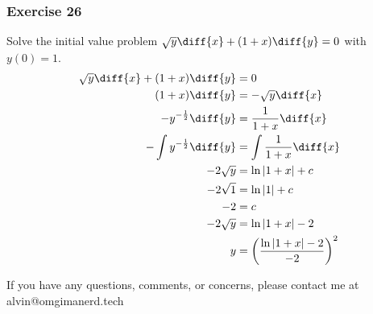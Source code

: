\documentclass{math}
\begin{document}
\subsubsection*{Exercise 26}
Solve the initial value problem \( \sqrt{y}\diff{x}+(1+x)\diff{y} = 0 \) with
\( y(0) = 1 \).
\begin{align*}
  \sqrt{y}\diff{x}+(1+x)\diff{y} &= 0 \\
  (1+x)\diff{y} &= -\sqrt{y}\diff{x} \\
  -y^{-\frac{1}{2}}\diff{y} &= \frac{1}{1+x}\diff{x} \\
  -\int y^{-\frac{1}{2}}\diff{y} &= \int\frac{1}{1+x}\diff{x} \\
  -2\sqrt{y} &= \ln|1+x|+c \\
  -2\sqrt{1} &= \ln|1|+c \\
  -2 &= c \\
  -2\sqrt{y} &= \ln|1+x|-2 \\
  y &= \bigg(\frac{\ln|1+x|-2}{-2}\bigg)^2
\end{align*}

\begin{center}
  If you have any questions, comments, or concerns, please contact me at
  alvin@omgimanerd.tech
\end{center}
\end{document}
